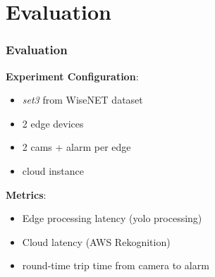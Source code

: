 \documentclass{beamer}
\begin{document}
\section{Evaluation}
\begin{frame}
\frametitle{Evaluation}
\textbf{Experiment Configuration}:
\begin{itemize}
    \item \textit{set3} from WiseNET dataset
    \item 2 edge devices 
    \item 2 cams + alarm per edge
    \item cloud instance
\end{itemize}
\textbf{Metrics}: 
\begin{itemize}
    \item Edge processing latency (yolo processing)
    \item Cloud latency (AWS Rekognition)
    \item round-time trip time from camera to alarm
\end{itemize}
\end{frame}
\end{document}
